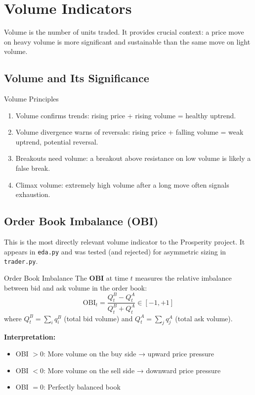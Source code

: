 \documentclass[12pt,a4paper,openany]{report}
\theoremstyle{definition}
\begin{document}

\chapter{Volume Indicators}

Volume is the number of units traded. It provides crucial context: a price move on heavy volume is more significant and sustainable than the same move on light volume.

\section{Volume and Its Significance}

\begin{keyconceptbox}{Volume Principles}
\begin{enumerate}[label=\arabic*.]
  \item Volume confirms trends: rising price + rising volume = healthy uptrend.
  \item Volume divergence warns of reversals: rising price + falling volume = weak uptrend, potential reversal.
  \item Breakouts need volume: a breakout above resistance on low volume is likely a false break.
  \item Climax volume: extremely high volume after a long move often signals exhaustion.
\end{enumerate}
\end{keyconceptbox}

\section{Order Book Imbalance (OBI)}

This is the most directly relevant volume indicator to the Prosperity project. It appears in \texttt{eda.py} and was tested (and rejected) for asymmetric sizing in \texttt{trader.py}.

\begin{definitionbox}{Order Book Imbalance}
The \textbf{OBI} at time $t$ measures the relative imbalance between bid and ask volume in the order book:
\[
  \text{OBI}_t = \frac{Q_t^B - Q_t^A}{Q_t^B + Q_t^A} \in [-1, +1]
\]
where $Q_t^B = \sum_i q_i^B$ (total bid volume) and $Q_t^A = \sum_j q_j^A$ (total ask volume).
\end{definitionbox}

\textbf{Interpretation:}
\begin{itemize}
  \item OBI $> 0$: More volume on the buy side → upward price pressure
  \item OBI $< 0$: More volume on the sell side → downward price pressure
  \item OBI $= 0$: Perfectly balanced book
\end{itemize}
\end{document}
